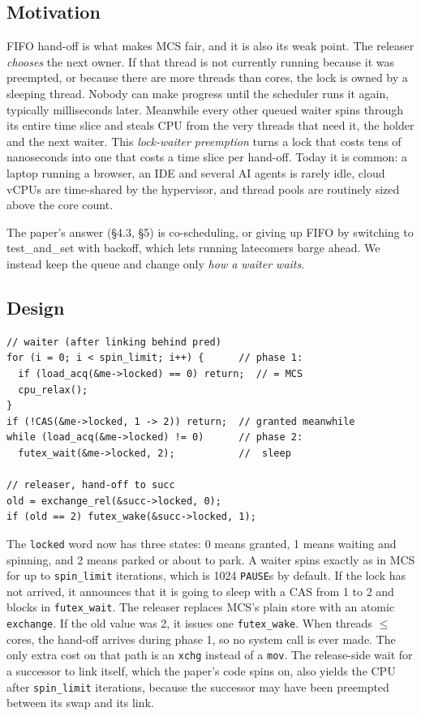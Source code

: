 \documentclass[10pt,twocolumn]{article}
\begin{document}
\subsection{Motivation}
FIFO hand-off is what makes MCS fair, and it is also its weak point. The releaser \emph{chooses} the next
owner. If that thread is not currently running because it was preempted, or because there are more threads
than cores, the lock is owned by a sleeping thread. Nobody can make progress until the scheduler runs it
again, typically milliseconds later. Meanwhile every other queued waiter spins through its entire time
slice and steals CPU from the very threads that need it, the holder and the next waiter. This
\emph{lock-waiter preemption} turns a lock that costs tens of nanoseconds into one that costs a time slice
per hand-off. Today it is common: a laptop running a browser, an IDE and several AI agents is rarely idle,
cloud vCPUs are time-shared by the hypervisor, and thread pools are routinely sized above the core count.

The paper's answer (\S4.3, \S5) is co-scheduling, or giving up FIFO by switching to
test\_and\_set with backoff, which lets running latecomers barge ahead. We instead keep the queue and change
only \emph{how a waiter waits}.

\subsection{Design}
\begin{lstlisting}
// waiter (after linking behind pred)
for (i = 0; i < spin_limit; i++) {      // phase 1:
  if (load_acq(&me->locked) == 0) return;  // = MCS
  cpu_relax();
}
if (!CAS(&me->locked, 1 -> 2)) return;  // granted meanwhile
while (load_acq(&me->locked) != 0)      // phase 2:
  futex_wait(&me->locked, 2);           //  sleep

// releaser, hand-off to succ
old = exchange_rel(&succ->locked, 0);
if (old == 2) futex_wake(&succ->locked, 1);
\end{lstlisting}
The \texttt{locked} word now has three states: 0 means granted, 1 means waiting and spinning, and 2 means
parked or about to park. A waiter spins exactly as in MCS for up to \texttt{spin\_limit} iterations, which is
1024 \texttt{PAUSE}s by default. If the lock has not arrived, it announces that it is going to sleep with a CAS
from 1 to 2 and blocks in \texttt{futex\_wait}. The releaser replaces MCS's plain store with an atomic
\texttt{exchange}. If the old value was 2, it issues one \texttt{futex\_wake}. When threads $\le$ cores,
the hand-off arrives during phase 1, so no system call is ever made. The only extra cost on that path is
an \texttt{xchg} instead of a \texttt{mov}. The release-side wait for a successor to link itself, which
the paper's code spins on, also yields the CPU after \texttt{spin\_limit} iterations, because the successor
may have been preempted between its swap and its link.
\end{document}
